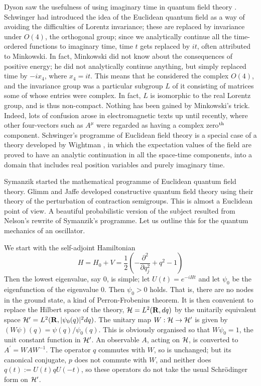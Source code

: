 Dyson saw the usefulness of using
imaginary time in quantum field theory \cite{Dyson}.
Schwinger \cite{Schwinger} had introduced
the idea of the Euclidean quantum field as a way
of avoiding the difficulties of Lorentz invariance; these are replaced by
invariance under $O(4)$, the orthogonal group; since we analytically
continue all the time-ordered functions to imaginary time, time $t$ gets
replaced by $it$, often attributed to Minkowski. In fact, Minkowski did not
know
about the consequences of positive energy; he did not analytically continue
anything, but simply replaced time by $-ix_4$, where $x_4=it$. This means
that he considered the complex $O(4)$, and the invariance group was
a particular subgroup $L$ of it
consisting of matrices some of whose entries were complex. In fact, $L$ is
isomorphic to the real Lorentz group, and is thus non-compact. Nothing has
been gained by Minkowski's trick. Indeed, lots of confusion arose in
electromagnetic texts up until recently, where other four-vectors such as
$A^\mu$ were regarded as having a complex zero$^{\rm th}$ component.
Schwinger's programme of Euclidean field theory is a special case of a theory
developed by Wightman \cite{Jost,SW}, in which the expectation values of the
field are
proved to have an analytic continuation in all the space-time components,
into a domain that includes real position variables and purely imaginary time.

Symanzik \cite{Symanzik} started the mathematical programme of Euclidean
quantum field theory. Glimm and Jaffe developed constructive quantum
field theory using their theory of the perturbation of contraction
semigroups. This is almost a Euclidean point of view. A beautiful
probabilistic version of the subject resulted from Nelson's rewrite of
Symanzik's programme. Let us outline this for the quantum mechanics
of an oscillator.

We start with the self-adjoint Hamiltonian
\begin{equation}
H=H_0+V=\frac{1}{2}(-\frac{\partial^2}{\partial q_j^2}+q^2-1)
\end{equation}
Then the lowest eigenvalue, say $0$, is simple; let $U(t)=e^{-iHt}$
and let $\psi_0$ be the eigenfunction of the eigenvalue $0$. Then $\psi_0>0$
holds. That is, there are no nodes in the ground state, a kind of
Perron-Frobenius
theorem. It is then convenient to replace the Hilbert space of the theory,
${\cal H}=L^2({\bf R},dq)$ by the unitarily equivalent space ${\cal
H}^\prime=L^2({\bf R},|\psi_0(q)|^2 dq)$. The unitary map $W:{\cal H}
\rightarrow{\cal H}^\prime$ is given by $(W\psi)(q)=\psi(q)/\psi_0(q)$.
This is obviously organised so that $W\psi_0=1$, the unit constant function
in ${\cal H}^\prime$.
An observable $A$, acting on ${\cal H}$, is converted to $A^\prime=
WAW^{-1}$. The operator $q$ commutes with $W$, so is
unchanged; but its canonical conjugate, $p$ does
not commute with $W$, and neither does $q(t):=U(t)qU(-t)$, so
these operators do not take the usual Schr\"{o}dinger form on ${\cal
H}^\prime$.

